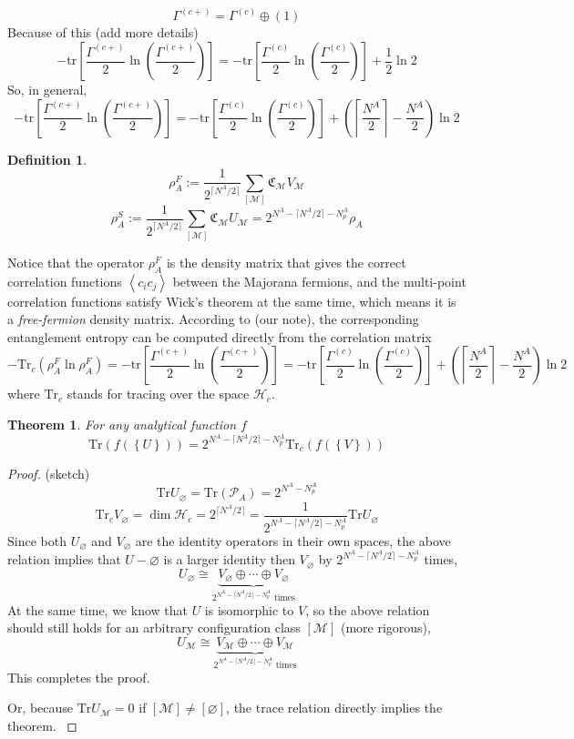 \documentclass[12font]{article}
\newtheorem{theorem}{Theorem}[section]
\theoremstyle{definition}
\newtheorem{definition}{Definition}[section]
\numberwithin{equation}{section}
\newcommand{\anglelr}[1]{\left\langle #1 \right\rangle}
\newcommand{\lr}[1]{\left(  #1  \right)}
\newcommand{\lrm}[1]{\left[  #1  \right]}
\newcommand{\lrg}[1]{\left\{  #1  \right\}}
\newcommand{\mrm}[1]{\mathrm{#1}}
\newcommand{\alert}[1]{{\color{red}#1}}
\newcommand{\Tr}{\mrm{Tr}}
\newcommand{\tr}{\mrm{tr}}
\begin{document}
\[
\Gamma^{(c+)} = \Gamma^{(c)}\oplus(1)
\]
Because of this \alert{(add more details)}
\begin{equation}\label{e.add-maj}
  -\tr\lrm{\frac{\Gamma^{(c+)}}{2}\ln\lr{\frac{\Gamma^{(c+)}}{2}}} = -\tr\lrm{\frac{\Gamma^{(c)}}{2}\ln\lr{\frac{\Gamma^{(c)}}{2}}} + \frac{1}{2}\ln 2 
\end{equation}
So, in general,
\[
-\tr\lrm{\frac{\Gamma^{(c+)}}{2}\ln\lr{\frac{\Gamma^{(c+)}}{2}}} = -\tr\lrm{\frac{\Gamma^{(c)}}{2}\ln\lr{\frac{\Gamma^{(c)}}{2}}} + \lr{\left\lceil\frac{N^A}{2}\right\rceil - \frac{N^A}{2}}\ln 2
\]

\begin{definition}
  \[
  \rho_A^F := \frac{1}{2^{\lceil N^A/2\rceil}} \sum_{[\mathcal{M}]}\mathfrak{C}_\mathcal{M}V_\mathcal{M}
  \]
  \[
  \rho_A^{S} := \frac{1}{2^{\lceil N^A/2\rceil}} \sum_{[\mathcal{M}]}\mathfrak{C}_\mathcal{M}U_\mathcal{M} = 2^{N^A-\lceil N^A/2\rceil -N_p^A}\rho_A
  \]
\end{definition}
Notice that the operator $\rho^F_A$ is the density matrix that gives the correct correlation functions $\anglelr{c_ic_j}$ between the Majorana fermions, and the multi-point correlation functions satisfy Wick's theorem at the same time, which means it is a \emph{free-fermion} density matrix. According to \alert{(our note)}, the corresponding entanglement entropy can be computed directly from the correlation matrix
\[
-\Tr_c\lr{\rho^F_A\ln\rho^F_A} = -\tr\lrm{\frac{\Gamma^{(c+)}}{2}\ln\lr{\frac{\Gamma^{(c+)}}{2}}} = -\tr\lrm{\frac{\Gamma^{(c)}}{2}\ln\lr{\frac{\Gamma^{(c)}}{2}}} + \lr{\left\lceil\frac{N^A}{2}\right\rceil - \frac{N^A}{2}}\ln 2
\]
where $\Tr_c$ stands for tracing over the space $\mathcal{H}_c$.
\begin{theorem}
For any analytical function $f$
  \[
  \Tr\lr{f(\lrg{U})} = 2^{N^A-\lceil N^A/2\rceil -N_p^A} \Tr_c\lr{f(\lrg{V})}
  \]
\end{theorem}
\begin{proof}
  \alert{(sketch)}
  \[
  \Tr U_\varnothing = \Tr\lr{\mathcal{P}_A} = 2^{N^A-N^A_p}
  \]
  \[
  \Tr_c V_\varnothing = \dim\mathcal{H}_c = 2^{\lceil N^A/2\rceil} = \frac{1}{2^{N^A-\lceil N^A/2\rceil -N_p^A}}\Tr U_\varnothing
  \]
  Since both $U_\varnothing$ and $V_\varnothing$ are the identity operators in their own spaces, the above relation implies that $U-\varnothing$ is a larger identity then $V_\varnothing$ by $2^{N^A-\lceil N^A/2\rceil -N_p^A}$ times,
  \[
  U_\mathcal{\varnothing} \cong \underbrace{V_\mathcal{\varnothing}\oplus\cdots\oplus V_\mathcal{\varnothing}}_{\text{$2^{N^A-\lceil N^A/2\rceil -N_p^A}$ times}}
  \]
  At the same time, we know that $U$ is isomorphic to $V$, so the above relation should still holds for an arbitrary configuration class $[\mathcal{M}]$ \alert{(more rigorous)},
  \[
  U_\mathcal{M} \cong \underbrace{V_\mathcal{M}\oplus\cdots\oplus V_\mathcal{M}}_{\text{$2^{N^A-\lceil N^A/2\rceil -N_p^A}$ times}}
  \]
  This completes the proof.
  
  \alert{Or, because $\Tr U_\mathcal{M}=0$ if $[\mathcal{M}]\neq[\varnothing]$,  the trace relation directly implies the theorem. }
\end{proof}
\end{document}
